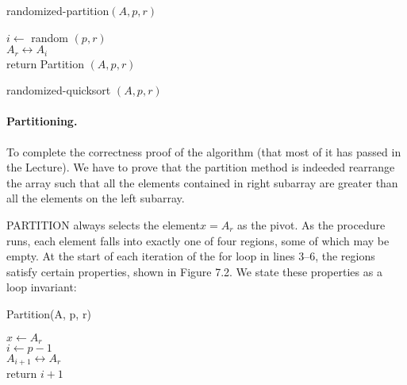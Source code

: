 \begin{algbox}{randomized-partition$(A, p, r)$}
  \begin{algorithm}[H]
      $i \leftarrow $ random $(p, r)$ \\
      $A_{r} \leftrightarrow A_{i} $ \\
      return Partition $(A, p, r)$
    \end{algorithm}
\end{algbox}
 \begin{algbox}{randomized-quicksort $(A, p, r)$}
      \begin{algorithm}[H]
      \end{algorithm}
\end{algbox}


\paragraph{Partitioning.}
To complete the correctness proof of the algorithm (that most of it has passed in the Lecture). We have to prove that the partition method is indeeded rearrange the array such that all the elements contained in right subarray are greater than all the elements on the left subarray.  


PARTITION always selects the element$ x = A_{r}$ as the pivot. As the procedure runs, each element falls into exactly one of four regions, some of which may be empty. At the start of each iteration of the for loop in lines 3–6, the regions satisfy certain properties, shown in Figure 7.2. We state these properties as a loop invariant:

\begin{algbox}{Partition(A, p, r)}
  \begin{algorithm}[H]
    $ x \leftarrow A_{r} $ \\
    $ i \leftarrow p - 1 $ \\
   $ A_{i+1} \leftrightarrow A_{r} $\\
   return $ i+1$
  \end{algorithm}
\end{algbox}


